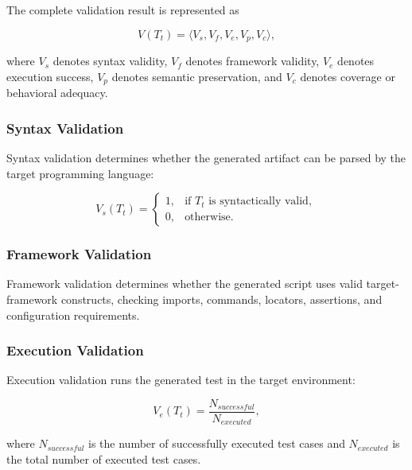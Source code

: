 \documentclass[pdflatex,sn-mathphys-num]{sn-jnl}
\begin{document}
The complete validation result is represented as

\begin{equation}
    V(T_t)
    =
    \langle
    V_s,V_f,V_e,V_p,V_c
    \rangle ,
\label{eq:complete-validation}
\end{equation}

where $V_s$ denotes syntax validity, $V_f$ denotes framework validity,
$V_e$ denotes execution success, $V_p$ denotes semantic preservation, and
$V_c$ denotes coverage or behavioral adequacy.

\subsubsection{Syntax Validation}

Syntax validation determines whether the generated artifact can be parsed
by the target programming language:

\begin{equation}
    V_s(T_t)
    =
    \begin{cases}
        1, & \text{if } T_t \text{ is syntactically valid},\\
        0, & \text{otherwise}.
    \end{cases}
\end{equation}

\subsubsection{Framework Validation}

Framework validation determines whether the generated script uses valid
target-framework constructs, checking imports, commands, locators, assertions,
and configuration requirements.

\subsubsection{Execution Validation}

Execution validation runs the generated test in the target environment:

\begin{equation}
    V_e(T_t)
    =
    \frac{N_{successful}}
         {N_{executed}},
\label{eq:execution-validity}
\end{equation}

where $N_{successful}$ is the number of successfully executed test cases
and $N_{executed}$ is the total number of executed test cases.
\end{document}
